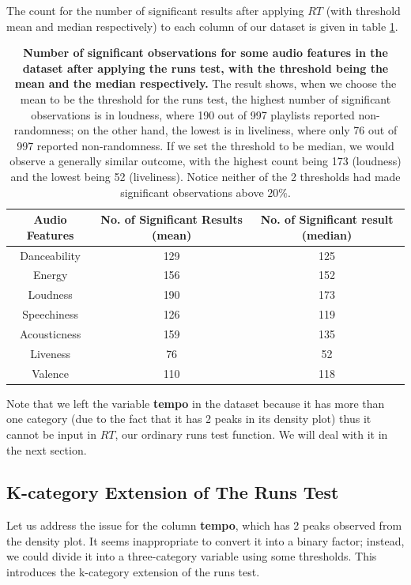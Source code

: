 \documentclass[12pt]{article}
\theoremstyle{plain}
\theoremstyle{definition}
\theoremstyle{remark}
\begin{document}
The count for the number of significant results after applying $RT$ (with threshold mean and median respectively) to each column of our dataset is given in table \ref{table 1}.

\begin{table}[h!]
\begin{tabular}{|c|c|c|}
    \hline
     Audio Features & No. of Significant Results (mean) & No. of Significant result (median) \\
    \hline
     Danceability &129&125\\
     \hline
     Energy &156&152\\
     \hline
     Loudness &190&173\\
     \hline
     Speechiness &126&119\\
     \hline
     Acousticness &159&135\\
     \hline
     Liveness &76&52\\
     \hline
     Valence &110&118\\
    \hline
\end{tabular}
  \caption{\textbf{Number of significant observations for some audio features in the dataset after applying the runs test, with the threshold being the mean and the median respectively.} The result shows, when we choose the mean to be the threshold for the runs test, the highest number of significant observations is in loudness, where 190 out of 997 playlists reported non-randomness; on the other hand, the lowest is in liveliness, where only 76 out of 997 reported non-randomness. If we set the threshold to be median, we would observe a generally similar outcome, with the highest count being 173 (loudness) and the lowest being 52 (liveliness). Notice neither of the 2 thresholds had made significant observations above $20\%$.}
  \label{table 1}
\end{table}
Note that we left the variable \textbf{tempo} in the dataset because it has more than one category (due to the fact that it has 2 peaks in its density plot) thus it cannot be input in $RT$, our ordinary runs test function. We will deal with it in the next section.


\newpage
\subsection{K-category Extension of The Runs Test}
Let us address the issue for the column \textbf{tempo}, which has 2 peaks observed from the density plot. It seems inappropriate to convert it into a binary factor; instead, we could divide it into a three-category variable using some thresholds. This introduces the k-category extension of the runs test\cite{3.4}\cite{3.3}.
\end{document}
